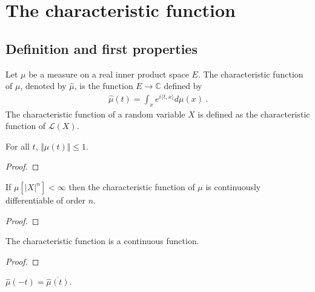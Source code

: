 \chapter{The characteristic function}

\section{Definition and first properties}

\begin{definition}\label{def:charFun}
 \leanok
Let $\mu$ be a measure on a real inner product space $E$. The characteristic function of $\mu$, denoted by $\hat{\mu}$, is the function $E \to \mathbb{C}$ defined by
\begin{align*}
\hat{\mu}(t) = \int_x e^{i \langle t, x \rangle} d\mu(x) \: .
\end{align*}
The characteristic function of a random variable $X$ is defined as the characteristic function of $\mathcal L(X)$.
\end{definition}


\begin{lemma}\label{lem:charFun_bounded}
 \leanok
{}
For all $t$, $\Vert\hat{\mu}(t)\Vert \le 1$.
\end{lemma}

\begin{proof}\leanok
\end{proof}


\begin{lemma}\label{lem:charFun_contDiff}
\leanok
{}
If $\mu[|X|^n] < \infty$ then the characteristic function of $\mu$ is continuously differentiable of order $n$.
\end{lemma}

\begin{proof}\leanok
\end{proof}


\begin{lemma}\label{lem:charFun_continuous}
\leanok
{}
The characteristic function is a continuous function.
\end{lemma}

\begin{proof}\leanok
{}
\end{proof}


\begin{lemma}\label{lem:charFun_neg}
 \leanok
{}
$\hat{\mu}(-t) = \overline{\hat{\mu}(t)}$.
\end{lemma}

